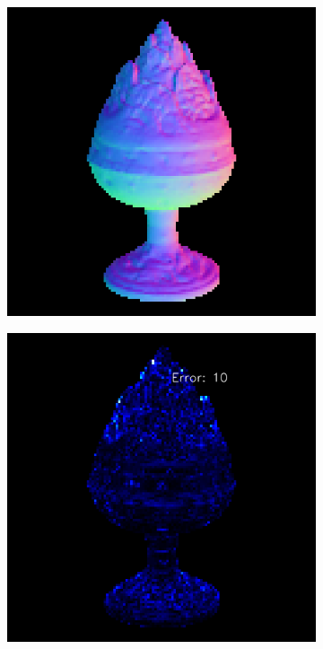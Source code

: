 \begin{figure}
\begin{subfigure}[b]{0.24\linewidth}
	\end{subfigure}
	\begin{subfigure}[b]{0.24\linewidth}
		\includegraphics[width=\linewidth]{./Figures/gcnn_synthetic/fancy_eval_2_normal_GCNN-GCNN.png}
	\end{subfigure}
	\begin{subfigure}[b]{0.24\linewidth}
		\includegraphics[width=\linewidth]{./Figures/gcnn_synthetic/fancy_eval_2_error_GCNN-GCNN.png}
	\end{subfigure}
	

\end{figure}
